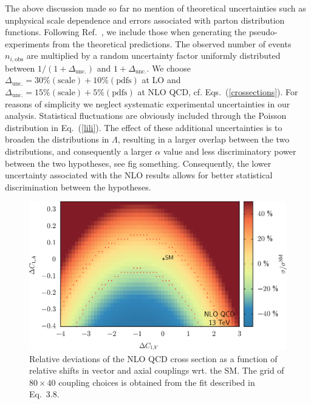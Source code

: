 \documentclass[preprint]{JHEP3} %
\begin{document}
The above discussion made so far no mention of theoretical uncertainties such as unphysical scale dependence and errors associated with parton distribution functions.
Following Ref.~\cite{Lykken et al}, we include those when generating the pseudo-experiments from the theoretical predictions. 
The observed number of events $n_{i,\mathrm{obs}}$ are multiplied by a random uncertainty factor uniformly distributed 
between $1/(1+\Delta_\mathrm{unc.})$ and $1+\Delta_\mathrm{unc.}$.
We choose $\Delta_\mathrm{unc.} = 30\% (\mathrm{scale}) + 10\%(\mathrm{pdfs})$ at LO
and $\Delta_\mathrm{unc.} = 15\% (\mathrm{scale}) + 5\%(\mathrm{pdfs})$ at NLO QCD, cf. Eqs.~(\ref{crossections}).
For reasons of simplicity we neglect systematic experimental uncertainties in our analysis. 
Statistical fluctuations are obviously included through the Poisson distribution in Eq.~(\ref{lili}).
The effect of these additional uncertainties is to broaden the distributions in $\Lambda$, 
resulting in a larger overlap between the two distributions, and consequently a larger $\alpha$ value and less discriminatory power between the two hypotheses, 
see fig something. Consequently, the lower uncertainty associated with the NLO results allows for better statistical discrimination between the hypotheses.

\begin{figure}[t]
\centering
\includegraphics[scale=0.6]{LHC_53_SigmaNLO.eps}
\caption{ \label{fig:vii} Relative deviations of the NLO QCD cross section as a function of relative shifts in vector and axial couplings wrt. the SM.
The grid of $ 80 \times 40 $ coupling choices is obtained from the fit described in Eq.~3.8. }
\end{figure}
\end{document}
